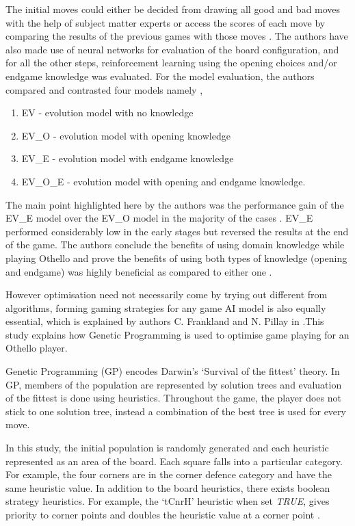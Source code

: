 \documentclass{svproc}
\begin{document}
The initial moves could either be decided from drawing all good and bad moves with the help of subject matter experts or access the scores of each move by comparing the results of the previous games with those moves \cite{esmond_2}. The authors have also made use of neural networks for evaluation of the board configuration, and for all the other steps, reinforcement learning using the opening choices and/or endgame knowledge was evaluated. For the model evaluation, the authors compared and contrasted four models namely \cite{esmond_2},

\begin{enumerate}
\item EV - evolution model with no knowledge
\item EV\_O - evolution model with opening knowledge
\item EV\_E - evolution model with endgame knowledge
\item EV\_O\_E - evolution model with opening and endgame knowledge.
\end{enumerate}

The main point highlighted here by the authors was the performance gain of the EV\_E model over the EV\_O model in the majority of the cases \cite{esmond_2}. EV\_E performed considerably low in the early stages but reversed the results at the end of the game. The authors conclude the benefits of using domain knowledge while playing Othello and prove the benefits of using both types of knowledge (opening and endgame) was highly beneficial as compared to either one \cite{esmond_2}.

However optimisation need not necessarily come by trying out different from algorithms, forming gaming strategies for any game AI model is also equally essential, which is explained by authors C. Frankland and N. Pillay in \cite{hema_1}.This study explains how Genetic Programming is used to optimise game playing for an Othello player.

Genetic Programming (GP) encodes Darwin’s ‘Survival of the fittest’ theory. In GP, members of the population are represented by solution trees and evaluation of the fittest is done using heuristics. Throughout the game, the player does not stick to one solution tree, instead a combination of the best tree is used for every move.

In this study, the initial population is randomly generated and each heuristic represented as an area of the board. Each square falls into a particular category. For example, the four corners are in the corner defence category and have the same heuristic value. In addition to the board heuristics, there exists boolean strategy heuristics. For example, the ‘tCnrH’ heuristic when set \emph{TRUE}, gives priority to corner points and doubles the heuristic value at a corner point \cite{hema_1}.
\end{document}
